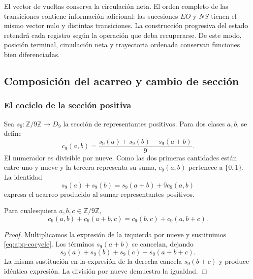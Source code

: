El vector de vueltas conserva la circulación neta. El orden completo de las transiciones contiene información adicional: las sucesiones $EO$ y $NS$ tienen el mismo vector nulo y distintas transiciones. La construcción progresiva del estado retendrá cada registro según la operación que deba recuperarse. De este modo, posición terminal, circulación neta y trayectoria ordenada conservan funciones bien diferenciadas.

\subsection{Composición del acarreo y cambio de sección}
\label{sec:app-cociclo}

\subsubsection{El cociclo de la sección positiva}

Sea $s_9:\mathbb Z/9\mathbb Z\to D_9$ la sección de representantes positivos. Para dos clases $a,b$, se define
\begin{equation}
 c_9(a,b)=\frac{s_9(a)+s_9(b)-s_9(a+b)}9.
 \label{eq:app-cocycle}
\end{equation}
El numerador es divisible por nueve. Como las dos primeras cantidades están entre uno y nueve y la tercera representa su suma, $c_9(a,b)$ pertenece a $\{0,1\}$. La identidad
\[
 s_9(a)+s_9(b)=s_9(a+b)+9c_9(a,b)
\]
expresa el acarreo producido al sumar representantes positivos.

\begin{bloqueindivisible}
\begin{teorema}
\label{thm:app-cociclo}
Para cualesquiera $a,b,c\in\mathbb Z/9\mathbb Z$,
\begin{equation}
 c_9(a,b)+c_9(a+b,c)
 =c_9(b,c)+c_9(a,b+c).
 \label{eq:app-cocycle-associativity}
\end{equation}
\end{teorema}

\begin{proof}
Multiplicamos la expresión de la izquierda por nueve y sustituimos \eqref{eq:app-cocycle}. Los términos $s_9(a+b)$ se cancelan, dejando
\[
 s_9(a)+s_9(b)+s_9(c)-s_9(a+b+c).
\]
La misma sustitución en la expresión de la derecha cancela $s_9(b+c)$ y produce idéntica expresión. La división por nueve demuestra la igualdad.
\end{proof}
\end{bloqueindivisible}

